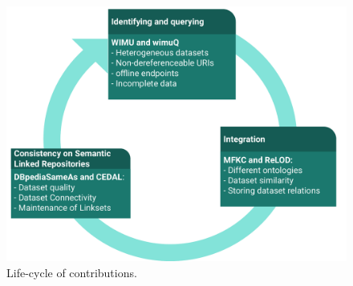 

\begin{figure}[htb] 
\centering
\includegraphics[width=1.0\linewidth]{sections/img/lifeThesis.pdf}
\caption{Life-cycle of contributions.}
\label{fig:lifecycle}
\end{figure} 

